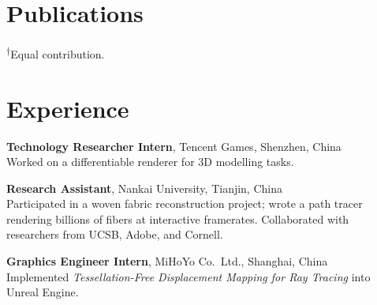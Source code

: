 \documentclass[11pt,a4paper]{article}
\begin{document}
\section*{Publications}

\begin{refsection}
    \nocite{Liao:2026:BoundaryAware}
    \nocite{Li:2026:WovenRecon}
    \nocite{Li:2025:FlowGaussian}
    \nocite{Shen:2025:ODEGlints}
    \nocite{Li:2025:EventTracer}
    \nocite{Qu:2025:XR}
    \nocite{Wei:2025:OE}
    \nocite{Li:2025:BPSDF}
    \nocite{Shen:2023:diffGlints}
    \nocite{Zhuang:2021:Denoise}
    \printbibliography[heading=none]
\end{refsection}
\vspace{0.3em}
{\footnotesize \textsuperscript{$\dagger$}Equal contribution.}

\section*{Experience}

\begin{tablist}
    \item[2023] \tab{}\textbf{Technology Researcher Intern}, Tencent Games, Shenzhen, China \\
                  \hspace{1em}Worked on a differentiable renderer for 3D modelling tasks.
    \item[2023] \tab{}\textbf{Research Assistant}, Nankai University, Tianjin, China \\
                  \hspace{1em}Participated in a woven fabric reconstruction project; wrote a path tracer rendering billions of fibers at interactive framerates. Collaborated with researchers from UCSB, Adobe, and Cornell.
    \item[2022] \tab{}\textbf{Graphics Engineer Intern}, MiHoYo Co.\ Ltd., Shanghai, China \\
                  \hspace{1em}Implemented \textit{Tessellation-Free Displacement Mapping for Ray Tracing} into Unreal Engine.
\end{tablist}
\end{document}

